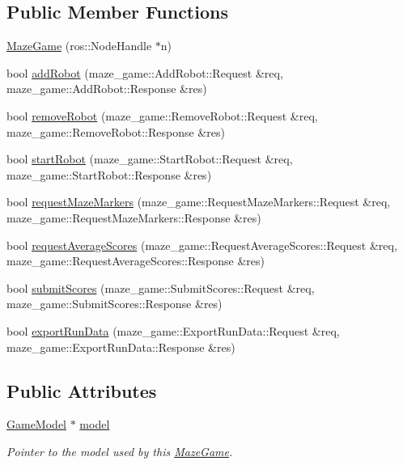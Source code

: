 \subsection*{Public Member Functions}
\begin{DoxyCompactItemize}
\item 
\hyperlink{classMazeGame_add7809c2ee39bb4d969e3d06200e6396}{Maze\-Game} (ros\-::\-Node\-Handle $\ast$n)
\item 
bool \hyperlink{classMazeGame_ab864d71bc5fdf038ffbb2e2966a240a0}{add\-Robot} (maze\-\_\-game\-::\-Add\-Robot\-::\-Request \&req, maze\-\_\-game\-::\-Add\-Robot\-::\-Response \&res)
\item 
bool \hyperlink{classMazeGame_a5c6771a8330241fe12f4d38b21827dec}{remove\-Robot} (maze\-\_\-game\-::\-Remove\-Robot\-::\-Request \&req, maze\-\_\-game\-::\-Remove\-Robot\-::\-Response \&res)
\item 
bool \hyperlink{classMazeGame_a0a8b1fa8e9165f0e7131c04f3c5e1967}{start\-Robot} (maze\-\_\-game\-::\-Start\-Robot\-::\-Request \&req, maze\-\_\-game\-::\-Start\-Robot\-::\-Response \&res)
\item 
bool \hyperlink{classMazeGame_a2c5ddcc5bf163ff953c3bbbbb7294e24}{request\-Maze\-Markers} (maze\-\_\-game\-::\-Request\-Maze\-Markers\-::\-Request \&req, maze\-\_\-game\-::\-Request\-Maze\-Markers\-::\-Response \&res)
\item 
bool \hyperlink{classMazeGame_a89f36d9e6de0a22983eef3bfbd6bb92f}{request\-Average\-Scores} (maze\-\_\-game\-::\-Request\-Average\-Scores\-::\-Request \&req, maze\-\_\-game\-::\-Request\-Average\-Scores\-::\-Response \&res)
\item 
bool \hyperlink{classMazeGame_a98aba2340bc3fc3893896cfd8d6f7710}{submit\-Scores} (maze\-\_\-game\-::\-Submit\-Scores\-::\-Request \&req, maze\-\_\-game\-::\-Submit\-Scores\-::\-Response \&res)
\item 
bool \hyperlink{classMazeGame_aef4dc5725931d93c5ec742228d1bb6a1}{export\-Run\-Data} (maze\-\_\-game\-::\-Export\-Run\-Data\-::\-Request \&req, maze\-\_\-game\-::\-Export\-Run\-Data\-::\-Response \&res)
\end{DoxyCompactItemize}
\subsection*{Public Attributes}
\begin{DoxyCompactItemize}
\item 
\hypertarget{classMazeGame_a7aa2f493b51187f851c9a7f8c3d2903d}{\hyperlink{classGameModel}{Game\-Model} $\ast$ \hyperlink{classMazeGame_a7aa2f493b51187f851c9a7f8c3d2903d}{model}}\label{classMazeGame_a7aa2f493b51187f851c9a7f8c3d2903d}

\begin{DoxyCompactList}\small\item\em Pointer to the model used by this \hyperlink{classMazeGame}{Maze\-Game}. \end{DoxyCompactList}\end{DoxyCompactItemize}
